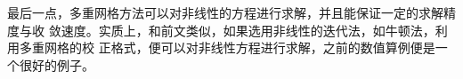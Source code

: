 \documentclass{article}
\begin{document}
最后一点，多重网格方法可以对非线性的方程进行求解，并且能保证一定的求解精度与收
敛速度。实质上，和前文类似，如果选用非线性的迭代法，如牛顿法，利用多重网格的校
正格式，便可以对非线性方程进行求解，之前的数值算例便是一个很好的例子。

\nocite{Briggs2000A, Oh2005A, Brandt2003Multigrid}

{}


\end{document}
